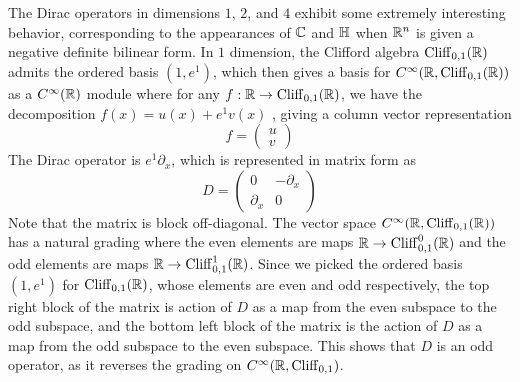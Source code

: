 The Dirac operators in dimensions $1$, $2$, and $4$ exhibit some extremely
interesting behavior, corresponding to the appearances of $\mathbb{C}$ and $\mathbb{H}$
when $\mathbb{R}^n$ is given a negative definite bilinear form. In $1$ dimension,
the Clifford algebra $\operatorname{Cliff}_{0,1}(\mathbb{R})$ admits the ordered basis $(1,e^1)$, which
then gives a basis for $C^\infty(\mathbb{R}, \operatorname{Cliff}_{0,1}(\mathbb{R}))$ as a
$C^\infty(\mathbb{R})$ module where for any $f : \mathbb{R} \to \operatorname{Cliff}_{0,1}(\mathbb{R})$, we have the
decomposition $f(x) = u(x) + e^1 v(x)$ , giving a column vector representation
\[
f = \begin{pmatrix}
u \\
v
\end{pmatrix}
\]
The Dirac operator is $e^1\partial_x$, which is represented in matrix form as
\[
D = \begin{pmatrix}
0 & -\partial_x \\
\partial_x & 0
\end{pmatrix}
\]
Note that the matrix is block off-diagonal. The vector space
$C^\infty(\mathbb{R}, \operatorname{Cliff}_{0,1}(\mathbb{R}))$ has a natural grading where the even elements
are maps $\mathbb{R} \to \operatorname{Cliff}_{0,1}^0(\mathbb{R})$ and the odd elements are maps
$\mathbb{R} \to \operatorname{Cliff}_{0,1}^1(\mathbb{R})$. Since we picked the ordered basis $(1,e^1)$
for $\operatorname{Cliff}_{0,1}(\mathbb{R})$, whose elements are even and odd respectively, the top
right block of the matrix is action of $D$ as a map from the even subspace to
the odd subspace, and the bottom left block of the matrix is the action of $D$
as a map from the odd subspace to the even subspace.
This shows that $D$ is an odd operator, as it reverses the grading on
$C^\infty(\mathbb{R}, \operatorname{Cliff}_{0,1})$. \\

